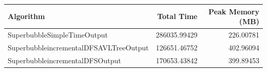 \begin{tabular}{lrr}
\toprule
Algorithm & Total Time & Peak Memory (MB) \\
\midrule
SuperbubbleSimpleTimeOutput & 286035.99429 & 226.00781 \\
SuperbubbleincrementalDFSAVLTreeOutput & 126651.46752 & 402.96094 \\
SuperbubbleincrementalDFSOutput & 170653.43842 & 399.89453 \\
\bottomrule
\end{tabular}
